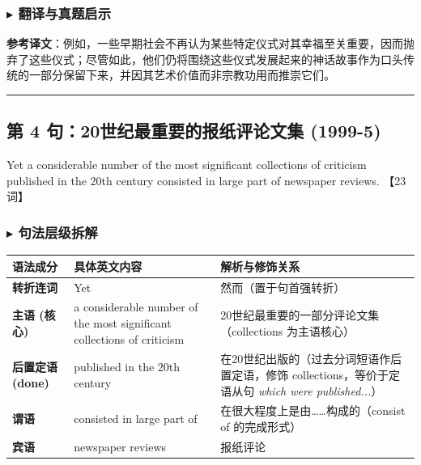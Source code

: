 \documentclass[cn,normal,11pt]{elegantnote}
\begin{document}
\subsubsection*{$\blacktriangleright$ 翻译与真题启示}
\begin{remark}
  \textbf{参考译文}：例如，一些早期社会不再认为某些特定仪式对其幸福至关重要，因而抛弃了这些仪式；尽管如此，他们仍将围绕这些仪式发展起来的神话故事作为口头传统的一部分保留下来，并因其艺术价值而非宗教功用而推崇它们。
\end{remark}

\par\vspace{10pt}\hrule\vspace{10pt}

\subsection{第 4 句：20世纪最重要的报纸评论文集 (1999-5)}

\begin{note}
  Yet a considerable number of the most significant collections of criticism published in the 20th century consisted in large part of newspaper reviews. 【23 词】
\end{note}

\subsubsection*{$\blacktriangleright$ 句法层级拆解}
\noindent
\begin{tabularx}{\textwidth}{p{3.2cm} X X}
  \toprule
  \textbf{语法成分} & \textbf{具体英文内容} & \textbf{解析与修饰关系} \\
  \midrule
  \textbf{转折连词} & Yet & 然而（置于句首强转折） \\
  \midrule
  \textbf{主语 (核心)} & a considerable number of the most significant collections of criticism & 20世纪最重要的一部分评论文集（collections 为主语核心） \\
  \midrule
  \textbf{后置定语 (done)} & published in the 20th century & 在20世纪出版的（过去分词短语作后置定语，修饰 collections，等价于定语从句 \textit{which were published...}） \\
  \midrule
  \textbf{谓语} & consisted in large part of & 在很大程度上是由……构成的（consist of 的完成形式） \\
  \midrule
  \textbf{宾语} & newspaper reviews & 报纸评论 \\
  \bottomrule
\end{tabularx}
\end{document}
